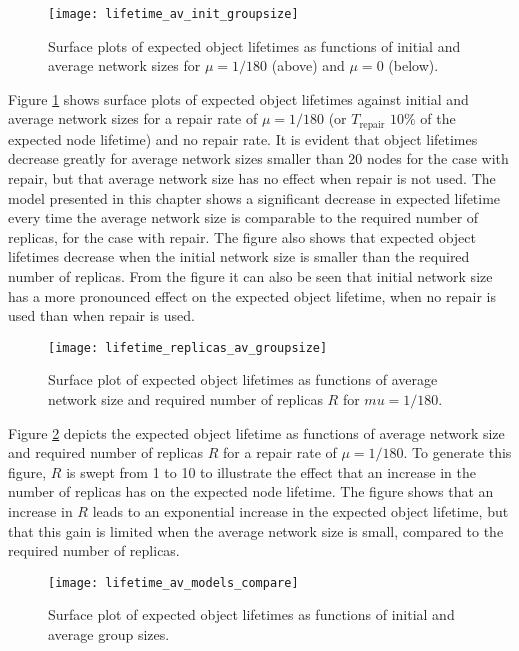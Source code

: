 \begin{figure}[htbp]
 \centering
 \texttt{[image: lifetime\_av\_init\_groupsize]}
 \caption{Surface plots of expected object lifetimes as functions of initial and average network sizes for $\mu = 1/180$ (above) and $\mu = 0$ (below).}
 \label{fig_lifetime_average_vs_initial}
\end{figure}
%
Figure \ref{fig_lifetime_average_vs_initial} shows surface plots of expected object lifetimes against initial and average network sizes for a repair rate of $\mu = 1/180$ (or $T_{\textrm{repair}}$ $10\%$ of the expected node lifetime) and no repair rate. It is evident that object lifetimes decrease greatly for average network sizes smaller than 20 nodes for the case with repair, but that average network size has no effect when repair is not used. The model presented in this chapter shows a significant decrease in expected lifetime every time the average network size is comparable to the required number of replicas, for the case with repair. The figure also shows that expected object lifetimes decrease when the initial network size is smaller than the required number of replicas. From the figure it can also be seen that initial network size has a more pronounced effect on the expected object lifetime, when no repair is used than when repair is used.

\begin{figure}[htbp]
 \centering
 \texttt{[image: lifetime\_replicas\_av\_groupsize]}
 \caption{Surface plot of expected object lifetimes as functions of average network size and required number of replicas $R$ for $mu = 1/180$.}
 \label{fig_lifetime_average_vs_replicas}
\end{figure}
%
Figure \ref{fig_lifetime_average_vs_replicas} depicts the expected object lifetime as functions of average network size and required number of replicas $R$ for a repair rate of $\mu = 1/180$. To generate this figure, $R$ is swept from 1 to 10 to illustrate the effect that an increase in the number of replicas has on the expected node lifetime. The figure shows that an increase in $R$ leads to an exponential increase in the expected object lifetime, but that this gain is limited when the average network size is small, compared to the required number of replicas.

\begin{figure}[htbp]
 \centering
 \texttt{[image: lifetime\_av\_models\_compare]}
 \caption{Surface plot of expected object lifetimes as functions of initial and average group sizes.}
 \label{fig_lifetime_vs_other_model}
\end{figure}

